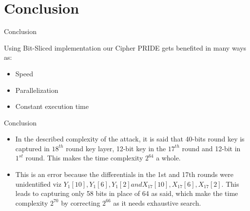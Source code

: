 \section{Conclusion}

\begin{frame}{Conclusion}
\begin{block}{}
    Using Bit-Sliced implementation our Cipher PRIDE gets benefited in many ways as:
	\begin{itemize}
		\item Speed
		\item Parallelization
		\item Constant execution time
	\end{itemize}
\end{block}
\end{frame}

\begin{frame}{Conclusion}
    \begin{block}{}
    \begin{itemize}
        \item In the described complexity of the attack, it is said that 40-bits round key is captured in $18^{th}$ round key layer, 12-bit key in the $17^{th}$ round and 12-bit in $1^{st}$ round. This makes the time complexity $2^{64}$ a whole.
    \end{itemize} 
    \end{block}
    \begin{block}{}
    \begin{itemize}
        \item This is an error because the differentials in the 1st and 17th rounds were unidentified viz $Y_1[10], Y_1[6], Y_1[2] and X_{17}[10], X_{17}[6], X_{17}[2]$. This leads to capturing only 58 bits in place of 64 as said, which make the time complexity $2^{70}$ by correcting $2^{66}$ as it needs exhaustive search.
    \end{itemize} 
    \end{block}
\end{frame}

